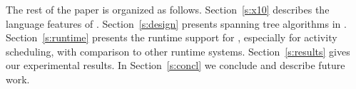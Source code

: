  The rest of the paper is organized as follows. Section~\ref{s:x10} describes the language features of \Xten{}. Section~\ref{s:design} presents spanning tree algorithms in \Xten{}. Section~\ref{s:runtime} presents the runtime support for \Xten{}, especially for activity scheduling, with comparison to other runtime systems. 
 Section~\ref{s:results} gives our experimental results. In Section~\ref{s:concl} we conclude and describe future work. 
  